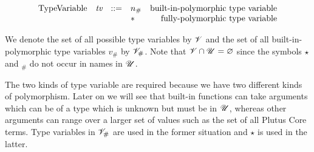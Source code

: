 \begin{minipage}{\linewidth}
  \centering
      \[\begin{array}{lrclr}
        \textrm{TypeVariable}    & \tv & ::= & n_{\#} & \textrm{built-in-polymorphic type variable}\\
                                 &    &      & \star & \textrm{fully-polymorphic type variable}\\
    \end{array}\]
    \label{fig:type-variables}
\end{minipage}

\medskip
\noindent
We denote the set of all possible type variables by $\mathscr{V}$ and the set of all
built-in-polymorphic type variables $v_\#$ by $\mathscr{V}_\#$.  Note that $\mathscr{V} \cap
\mathscr{U} = \varnothing$ since the symbols $\star$ and ${}_\#$ do not occur in names in $\mathscr{U}$.%
%
%
%
%

The two kinds of type variable are required because we have two different kinds
of polymorphism. Later on we will see that built-in functions can take arguments
which can be of a type which is unknown but must be in $\mathscr{U}$, whereas other
arguments can range over a larger set of values such as the set of all Plutus
Core terms. Type variables in $\mathscr{V}_\#$ are used in the former situation and
$\star$ is used in the latter.

